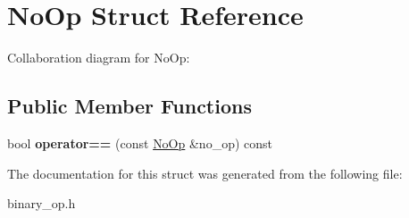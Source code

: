 \hypertarget{structNoOp}{\section{No\-Op Struct Reference}
\label{structNoOp}
}


Collaboration diagram for No\-Op\-:
\subsection*{Public Member Functions}
\begin{DoxyCompactItemize}
\item 
\hypertarget{structNoOp_a77e921f0499ca1fb4a5c9ead5c02a65c}{bool {\bfseries operator==} (const \hyperlink{structNoOp}{No\-Op} \&no\-\_\-op) const }\label{structNoOp_a77e921f0499ca1fb4a5c9ead5c02a65c}

\end{DoxyCompactItemize}


The documentation for this struct was generated from the following file\-:\begin{DoxyCompactItemize}
\item 
binary\-\_\-op.\-h\end{DoxyCompactItemize}
